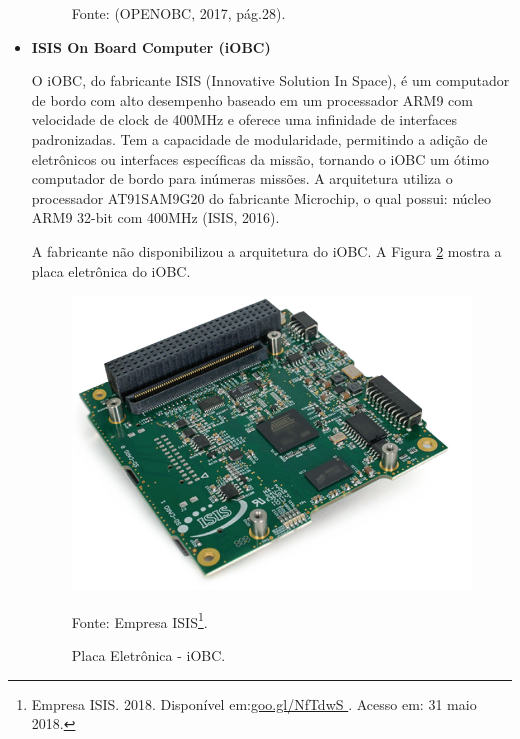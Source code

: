 \begin{itemize}
\begin{figure}[h]
	Fonte: (OPENOBC, 2017, pág.28). \linebreak
	
	\label{fig13}
\end{figure}

\newpage

\item \textbf{ISIS On Board Computer (iOBC)}

O iOBC, do fabricante  ISIS (Innovative Solution In Space), é um computador de bordo com alto desempenho baseado em um processador ARM9 com velocidade de clock de 400MHz e oferece uma infinidade de interfaces padronizadas. Tem a capacidade de modularidade, permitindo a adição de eletrônicos ou interfaces específicas da missão, tornando o iOBC um ótimo computador de bordo para inúmeras missões.	A arquitetura utiliza o processador AT91SAM9G20 do fabricante Microchip, o qual possui: núcleo ARM9 32-bit com 400MHz (ISIS, 2016).

A fabricante não disponibilizou a arquitetura do iOBC. A Figura \ref{fig14} mostra a placa eletrônica do iOBC. 

\begin{figure}[h]
	\centering
    \caption{Placa Eletrônica - iOBC.}
    
	\includegraphics[keepaspectratio=true,scale=0.48]{figuras/isis.PNG}
	
	Fonte: Empresa ISIS\footnote{Empresa ISIS. 2018. Disponível em:\url{goo.gl/NfTdwS
		}. Acesso em: 31 maio 2018.}. \linebreak
	
	\label{fig14}
\end{figure}


\end{itemize}
